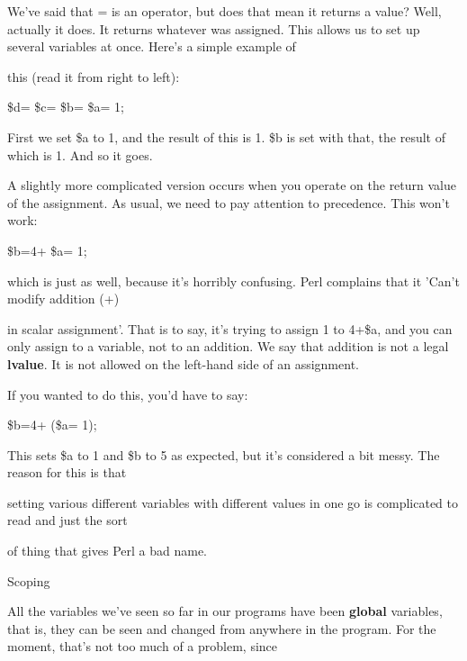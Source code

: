 \documentclass[a4paper,11pt]{book}
\begin{document}
\noindent We've said that = is an operator, but does that mean it returns a value? Well, actually it does. It returns whatever was assigned. This allows us to set up several variables at once. Here's a simple example of

\noindent this (read it from right to left):

\noindent 

\noindent \$d= \$c= \$b= \$a= 1;

\noindent 

\noindent First we set \$a to 1, and the result of this is 1. \$b is set with that, the result of which is 1. And so it goes.

\noindent 

\noindent A slightly more complicated version occurs when you operate on the return value of the assignment. As usual, we need to pay attention to precedence. This won't work:

\noindent 

\noindent \$b=4+ \$a= 1;

\noindent 

\noindent which is just as well, because it's horribly confusing. Perl complains that it 'Can't modify addition (+)

\noindent in scalar assignment'.  That is  to  say,  it's  trying  to  assign  1 to  4+\$a,  and you  can  only  assign  to  a variable, not to an addition. We say that addition is not a legal \textbf{lvalue}. It is not allowed on the left-hand side of an assignment.

\noindent 

\noindent 

\noindent If you wanted to do this, you'd have to say:

\noindent 

\noindent 

\noindent \$b=4+ (\$a= 1);

\noindent 

\noindent This sets \$a to 1 and \$b to 5 as expected, but it's considered a bit messy. The reason for this is that

\noindent setting various different variables with different values in one go is complicated to read and just the sort

\noindent of thing that gives Perl a bad name.

\noindent 

\noindent Scoping

\noindent 

\noindent All the variables we've seen so far in our programs have been \textbf{global }variables, that is, they can be seen and changed from anywhere in the program. For the moment, that's not too much of a problem, since
\end{document}
